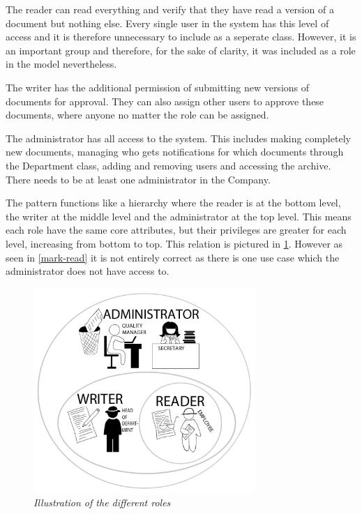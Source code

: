 The reader can read everything and verify that they have read a version of a document but nothing else.
Every single user in the system has this level of access and it is therefore unnecessary to include as a seperate class.
However, it is an important group and therefore, for the sake of clarity, it was included as a role in the model nevertheless.

The writer has the additional permission of submitting new versions of documents for approval. They can also assign other users to approve these documents, where anyone no matter the role can be assigned.

The administrator has all access to the system.
This includes making completely new documents, managing who gets notifications for which documents through the Department class, adding and removing users and accessing the archive.
There needs to be at least one administrator in the Company.

The pattern functions like a hierarchy where the reader is at the bottom level, the writer at the middle level and the administrator at the top level. This means each role have the same core attributes, but their privileges are greater for each level, increasing from bottom to top.
This relation is pictured in \cref{fig:RoleIllustration}.
However as seen in \cref{mark-read} it is not entirely correct as there is one use case which the administrator does not have access to.
\begin{figure}[H]
	\centering
	\includegraphics[width=0.75\textwidth]{billeder/RP-Roller2.jpg}
	\caption{\textit{Illustration of the different roles
	}\label{fig:RoleIllustration}}
\end{figure}


